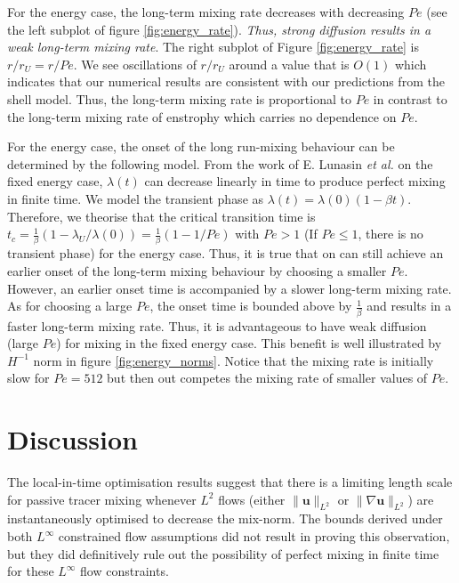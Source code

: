 \documentclass[12pt]{iopart}
\newcommand{\ltwo}[1]{\|#1\|_{L^{2}}}
\begin{document}
For the energy case, the long-term mixing rate decreases with decreasing $Pe$ (see the left subplot of figure \ref{fig:energy_rate}).  {\it Thus, strong diffusion results in a weak long-term mixing rate}. The right subplot of Figure \ref{fig:energy_rate} is $r/r_{U} =  r/Pe$. We see oscillations of $r/r_{U}$ around a value that is $O(1)$ which indicates that our numerical results are consistent with our predictions from the shell model. Thus, the long-term mixing rate is proportional to $Pe$ in contrast to the long-term mixing rate of enstrophy which carries no dependence on $Pe$.

For the energy case, the onset of the long run-mixing behaviour can be determined by the following model. From the work of E. Lunasin {\it et al.} \cite{JMP2012} on the fixed energy case, $\lambda(t)$ can decrease linearly in time to produce perfect mixing in finite time. We model the transient phase as $\lambda(t)=\lambda(0)(1-\beta t)$. Therefore, we theorise that the critical transition time is $t_{c}=\frac{1}{\beta}(1 -\lambda_{U}/\lambda(0)) = \frac{1}{\beta}(1 - 1/Pe)$ with $Pe> 1$ (If $Pe \leq 1$, there is no transient phase) for the energy case. Thus, it is true that on can still achieve an earlier onset of the long-term mixing behaviour by choosing a smaller $Pe$. However, an earlier onset time is accompanied by a slower long-term mixing rate. As for choosing a large $Pe$, the onset time is bounded above by $\frac{1}{\beta}$ and results in a faster long-term mixing rate. Thus, it is advantageous to have weak diffusion (large $Pe$) for mixing in the fixed energy case. This benefit is well illustrated by $H^{-1}$ norm in figure \ref{fig:energy_norms}. Notice that the mixing rate is initially slow for $Pe = 512$ but then out competes the mixing rate of smaller values of $Pe$.    


\section{Discussion}
\label{sec:discussion}
%
The local-in-time optimisation results suggest that there is a limiting length scale for passive tracer mixing whenever $L^{2}$ flows (either $\ltwo{\mathbf{u}}$ or $\ltwo{\nabla\mathbf{u}}$) are instantaneously optimised to decrease the mix-norm. The bounds derived under both $L^{\infty}$ constrained flow assumptions did not result in proving this observation, but they did definitively rule out the possibility of perfect mixing in finite time for these $L^{\infty}$ flow constraints. 
\end{document}
